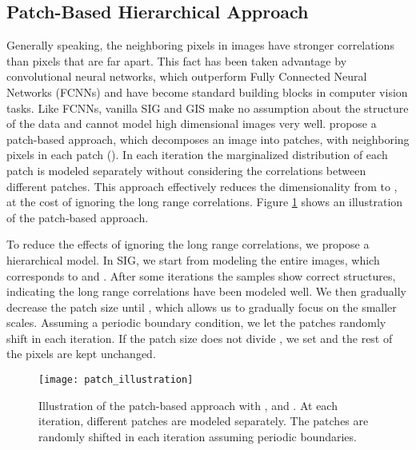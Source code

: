 \documentclass{article}
\begin{document}
\subsection{Patch-Based Hierarchical Approach}

\label{subsec:patch}

Generally speaking, the neighboring pixels in images have stronger correlations than pixels that are far apart. This fact has been taken advantage by convolutional neural networks, which outperform Fully Connected Neural Networks (FCNNs) and have become standard building blocks in computer vision tasks. Like FCNNs, vanilla SIG and GIS make no assumption about the structure of the data and cannot model high dimensional images very well. \citet{meng2020gaussianization} propose a patch-based approach, which decomposes an  image into  patches, with  neighboring pixels in each patch (). In each iteration the marginalized distribution of each patch is modeled separately without considering the correlations between different patches. This approach effectively reduces the dimensionality from  to , at the cost of ignoring the long range correlations. Figure \ref{fig:patch} shows an illustration of the patch-based approach. 

To reduce the effects of ignoring the long range correlations, we propose a hierarchical model. In SIG, we start from modeling the entire images, which corresponds to  and . After some iterations the samples show correct structures, indicating the long range correlations have been modeled well. We then gradually decrease the patch size  until , which allows us to gradually focus on the smaller scales. Assuming a periodic boundary condition, we let the patches randomly shift in each iteration. If the patch size  does not divide , we set  and the rest of the pixels are kept unchanged.

\begin{figure}[t]
     \centering
      \texttt{[image: patch\_illustration]}
     \caption{Illustration of the patch-based approach with ,  and . At each iteration, different patches are modeled separately. The patches are randomly shifted in each iteration assuming periodic boundaries.}
     \label{fig:patch}
     \vskip -0.1in
\end{figure}

\iffalse
\begin{figure}[t]
     \centering
      \texttt{[image: hierarchy]}
     \caption{Illustration of the hierarchical modeling of an  image. The patch size starts from  and gradually decreases to .}
     \label{fig:patch_hierarchy}
     \vskip -0.1in
\end{figure}
\fi
\end{document}
